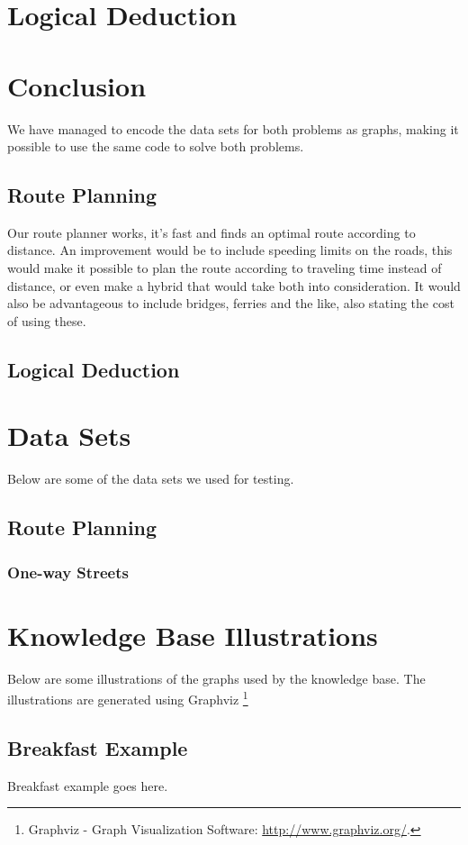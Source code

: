 \documentclass[11pt]{article}
\begin{document}
\section{Logical Deduction}


\section{Conclusion}
We have managed to encode the data sets for both problems as graphs, making it possible to use the same code to solve both problems.

\subsection{Route Planning}
Our route planner works, it's fast and finds an optimal route according to distance. An improvement would be to include speeding limits on the roads, this would make it possible to plan the route according to traveling time instead of distance, or even make a hybrid that would take both into consideration. It would also be advantageous to include bridges, ferries and the like, also stating the cost of using these.

\subsection{Logical Deduction}

\clearpage
{}
\begin{appendices}

\section{Data Sets}
Below are some of the data sets we used for testing.

\subsection{Route Planning}
\subsubsection{One-way Streets}
\label{subsec:oneway}


\section{Knowledge Base Illustrations}
Below are some illustrations of the graphs used by the knowledge base. The illustrations are generated using Graphviz \footnote{Graphviz - Graph Visualization Software:  \url{http://www.graphviz.org/}.}

\subsection{Breakfast Example}
Breakfast example goes here.
\end{appendices}
\end{document}
